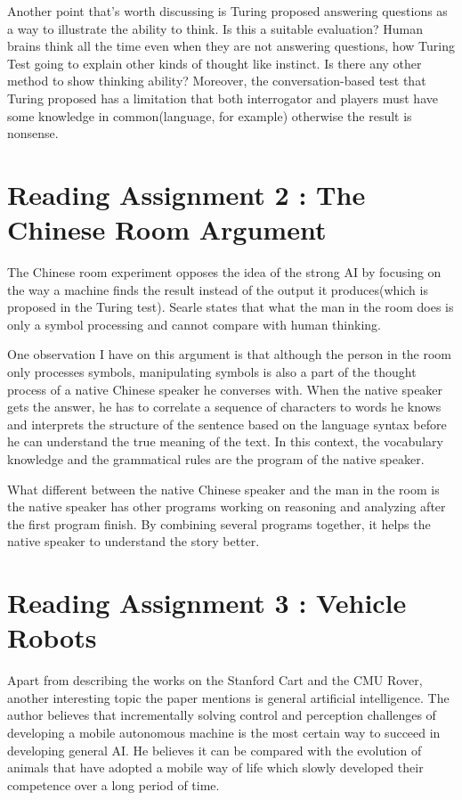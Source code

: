 \documentclass{article}
\begin{document}
Another point that's worth discussing is Turing proposed answering questions as a way to illustrate the ability to think. Is this a suitable evaluation? Human brains think all the time even when they are not answering questions, how Turing Test going to explain other kinds of thought like instinct. Is there any other method to show thinking ability? Moreover, the conversation-based test that Turing proposed has a limitation that both interrogator and players must have some knowledge in common(language, for example) otherwise the result is nonsense.

\section*{Reading Assignment 2 : The Chinese Room Argument}
The Chinese room experiment opposes the idea of the strong AI by focusing on the way a machine finds the result instead of the output it produces(which is proposed in the Turing test).  Searle states that what the man in the room does is only a symbol processing and cannot compare with human thinking.

One observation I have on this argument is that although the person in the room only processes symbols, manipulating symbols is also a part of the thought process of a native Chinese speaker he converses with. When the native speaker gets the answer, he has to correlate a sequence of characters to words he knows and interprets the structure of the sentence based on the language syntax before he can understand the true meaning of the text. In this context, the vocabulary knowledge and the grammatical rules are the program of the native speaker. 

What different between the native Chinese speaker and the man in the room is the native speaker has other programs working on reasoning and analyzing after the first program finish. By combining several programs together, it helps the native speaker to understand the story better.

\clearpage

\section*{Reading Assignment 3 : Vehicle Robots}
Apart from describing the works on the Stanford Cart and the CMU Rover,
another interesting topic the paper mentions is general artificial intelligence. The author believes that incrementally solving control and perception challenges of developing a mobile autonomous machine is the most certain way to succeed in developing general AI. He believes it can be compared with the evolution of animals that have adopted a mobile way of life which slowly developed their competence over a long period of time.
\end{document}
